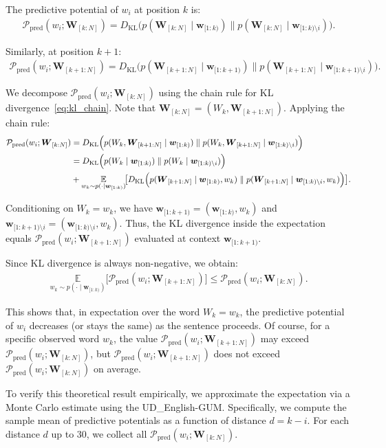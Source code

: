 \documentclass[11pt]{article}
\newcommand{\Wseq}[2]{\ensuremath{\boldsymbol W_{[#1: #2]}}\xspace}
\newcommand{\curid}{\ensuremath{k}\xspace}
\newcommand{\sstartid}{\ensuremath{1}\xspace}
\newcommand{\sendid}{\ensuremath{N}\xspace}
\newcommand{\nextid}{\ensuremath{\curid+1}\xspace}
\newcommand{\targetid}{\ensuremath{i}\xspace}
\newcommand{\wcur}{\ensuremath{w_{\curid}}\xspace}
\newcommand{\Wcur}{\ensuremath{W_{\curid}}\xspace}
\newcommand{\wtarget}{\ensuremath{w_{\targetid}}\xspace}
\newcommand{\context}{\ensuremath{\boldsymbol w_{[\sstartid:\curid)}}\xspace}
\newcommand{\contextwotarget}{\ensuremath{\boldsymbol w_{[1:\curid)\setminus \targetid}}\xspace}
\newcommand{\Futurenext}{\ensuremath{\Wseq{\nextid}{\sendid}}\xspace}
\newcommand{\Future}{\ensuremath{\Wseq{\curid}{\sendid}}\xspace}
\newcommand{\contextnext}{\ensuremath{\boldsymbol{w}_{[\sstartid:\curid+1)}}\xspace}
\newcommand{\contextwotargetnext}{\ensuremath{\boldsymbol{w}_{[\sstartid:\curid+1)\setminus\targetid}}\xspace}
\newcommand{\FutureNext}{\ensuremath{\Wseq{\nextid}{\sendid}}\xspace}
\newcommand{\CHMI}{\ensuremath{\mathcal{P}_{\mathrm{pred}}}\xspace}
\newcommand{\chmi}[2]{\ensuremath{\CHMI(#1;#2)}\xspace}
\newcommand{\condprob}[2]{\ensuremath{p(#1\mid #2)}\xspace}
\newcommand{\condE}[3]{\ensuremath{\underset{#1\sim\condprob{\cdot}{#2}}{\mathbb{E}}\!\big[#3\big]}\xspace}
\newcommand{\KL}[2]{\ensuremath{D_{\operatorname{KL}}\Big(#1\parallel #2\Big)}\xspace}
\begin{document}
The predictive potential of \wtarget at position \curid is:
\begin{align}
    \chmi{\wtarget}{\Future} = \KL{\condprob{\Future}{\context}}{\condprob{\Future}{\contextwotarget}}.
\end{align}

Similarly, at position \nextid:
\begin{align}
    \chmi{\wtarget}{\FutureNext} = \KL{\condprob{\Futurenext}{\contextnext}}{\condprob{\Futurenext}{\contextwotargetnext}}.
\end{align}

We decompose \chmi{\wtarget}{\Future} using the chain rule for KL divergence~\eqref{eq:kl_chain}.
Note that $\Future = (W_k, \FutureNext)$.
Applying the chain rule:
\begin{align}
    \chmi{\wtarget}{\Future}
    &= \KL{\condprob{\Wcur,\Futurenext}{\context}}{\condprob{\Wcur,\Futurenext}{\contextwotarget}} \notag\\
    &= \KL{\condprob{\Wcur}{\context}}{\condprob{\Wcur}{\contextwotarget}} \notag\\
    &+ \condE{\wcur}{\context}{\KL{\condprob{\Futurenext}{\context,\wcur}}{\condprob{\Futurenext}{\contextwotarget,\wcur}}}.
\end{align}

Conditioning on $W_{\curid} = \wcur$, we have $\contextnext = (\context, \wcur)$ and $\contextwotargetnext = (\contextwotarget, \wcur)$.
Thus, the KL divergence inside the expectation equals \chmi{\wtarget}{\FutureNext} evaluated at context \contextnext.


Since KL divergence is always non-negative, we obtain:
\begin{align}
    \condE{\wcur}{\context}{\chmi{\wtarget}{\FutureNext}}\leq \chmi{\wtarget}{\Future}.
\end{align}

This shows that, in expectation over the word $\Wcur=\wcur$, the predictive potential of \wtarget decreases (or stays the same) as the sentence proceeds.
Of course, for a specific observed word \wcur, the value \chmi{\wtarget}{\FutureNext} may exceed \chmi{\wtarget}{\Future}, but \chmi{\wtarget}{\FutureNext} does not exceed \chmi{\wtarget}{\Future} on average.


To verify this theoretical result empirically, we approximate the expectation via a Monte Carlo estimate using the UD\_English-GUM.
Specifically, we compute the sample mean of predictive potentials as a function of distance $d = k - i$.
For each distance $d$ up to 30, we collect all \chmi{\wtarget}{\Future}.
\end{document}
